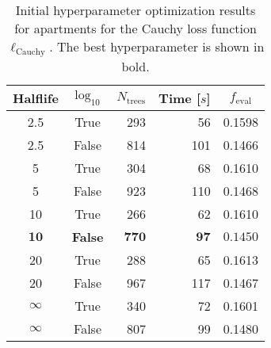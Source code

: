 \begin{table}[h!]
  \begin{tabular}{@{}ccrrc@{}}
    Halflife & $\log_{10}$ & $N_\mathrm{trees}$ & Time [$s$] & $f_\mathrm{eval}$ \\
    \midrule
    \num{2.5} & True & \num{293} & \num{56} & \num{0.1598} \\
    \num{2.5} & False & \num{814} & \num{101} & \num{0.1466} \\
    \num{5} & True & \num{304} & \num{68} & \num{0.1610} \\
    \num{5} & False & \num{923} & \num{110} & \num{0.1468} \\
    \num{10} & True & \num{266} & \num{62} & \num{0.1610} \\
    $\mathbf{10}$ & \textbf{False} & $\mathbf{770}$ & $\mathbf{97}$ & $\mathbf{0.1450}$ \\
    \num{20} & True & \num{288} & \num{65} & \num{0.1613} \\
    \num{20} & False & \num{967} & \num{117} & \num{0.1467} \\
    $\infty$ & True & \num{340} & \num{72} & \num{0.1601} \\
    $\infty$ & False & \num{807} & \num{99} & \num{0.1480} \\
  \end{tabular}
  \caption[Initial Hyperparameter Optimization Results for Apartments -- Cauchy Loss Function]{\label{tab:h:HPO_initial_Cauchy-ejerlejlighed-appendix}Initial hyperparameter optimization results for apartments for the Cauchy loss function $\ell_\mathrm{Cauchy}$. The best hyperparameter is shown in bold.}
\end{table}


